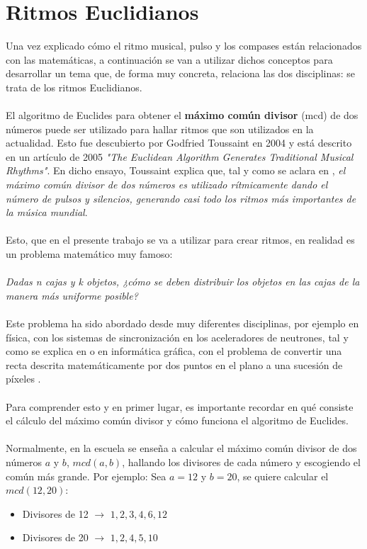 \documentclass[a4paper, openright, 11pt, titlepage]{report}
\theoremstyle{definition}\newtheorem{defin}[propo]{Definition}
\theoremstyle{definition}\newtheorem{obser}[propo]{Remark}
\theoremstyle{definition}\newtheorem{ejem}[propo]{Ejemplo}
\theoremstyle{definition}\newtheorem{algoritmo}[propo]{Algoritmo}
\begin{document}
\section{Ritmos Euclidianos}
Una vez explicado cómo el ritmo musical, pulso y los compases están relacionados con las matemáticas, a continuación se van a utilizar dichos conceptos para desarrollar un tema que, de forma muy concreta, relaciona las dos disciplinas: se trata de los ritmos Euclidianos.\\\\
El algoritmo de Euclides para obtener el \textbf{máximo común divisor} (mcd) de dos números puede ser utilizado para hallar ritmos que son utilizados en la actualidad. Esto fue descubierto por Godfried Toussaint en 2004 y está descrito en un artículo de 2005 \textit{"The Euclidean Algorithm Generates Traditional Musical Rhythms"}. En dicho ensayo, Toussaint explica que, tal y como se aclara en \cite{wikieuclides}, \textit{el máximo común divisor de dos números es utilizado rítmicamente dando el número de pulsos y silencios, generando casi todo los ritmos más importantes de la música mundial}. \\\\
Esto, que en el presente trabajo se va a utilizar para crear ritmos, en realidad es un problema matemático muy famoso: \\\\
\textit{Dadas n cajas y k objetos, ¿cómo se deben distribuir los objetos en las cajas de la manera más uniforme posible?}\\\\
Este problema ha sido abordado desde muy diferentes disciplinas, por ejemplo en física, con los sistemas de sincronización en los aceleradores de neutrones, tal y como se explica en \cite{ritmos} o en informática gráfica, con el problema de convertir una recta descrita matemáticamente por dos puntos en el plano a una sucesión de píxeles \cite{ritmos2}.\\\\
Para comprender esto y en primer lugar, es importante recordar en qué consiste el cálculo del máximo común divisor y cómo funciona el algoritmo de Euclides.\\\\
Normalmente, en la escuela se enseña a calcular el máximo común divisor de dos números $a$ y $b$, $mcd(a, b)$, hallando los divisores de cada número y escogiendo el común más grande. Por ejemplo: Sea $a = 12$ y $b = 20$, se quiere calcular el $mcd(12,20)$: 
\begin{itemize}
    \item Divisores de 12 $\longrightarrow$ ${1, 2, 3, \boxed{4}, 6, 12}$
    \item Divisores de 20 $\longrightarrow$ ${1, 2, \boxed{4}, 5, 10}$
\end{itemize}
\end{document}
